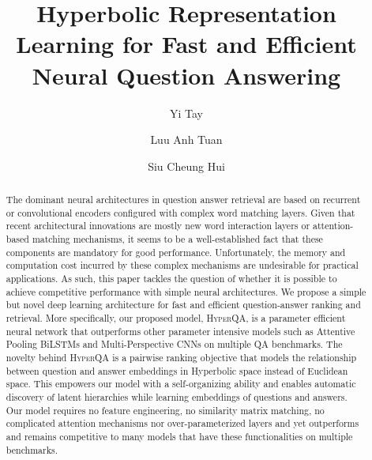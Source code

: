 \documentclass[sigconf]{acmart}
\begin{document}
\title{Hyperbolic Representation Learning for Fast and Efficient Neural Question Answering} 

\author{Yi Tay}

\author{Luu Anh Tuan}


\author{Siu Cheung Hui}


\begin{abstract}

The dominant neural architectures in question answer retrieval are based on recurrent or convolutional encoders configured with complex word matching layers. Given that recent architectural innovations are mostly new word interaction layers or attention-based matching mechanisms, it seems to be a well-established fact that these components are mandatory for good performance. Unfortunately, the memory and computation cost incurred by these complex mechanisms are undesirable for practical applications. As such, this paper tackles the question of whether it is possible to achieve competitive performance with simple neural architectures. We propose a simple but novel deep learning architecture for fast and efficient question-answer ranking and retrieval. More specifically, our proposed model, \textsc{HyperQA}, is a parameter efficient neural network that outperforms other parameter intensive models such as Attentive Pooling BiLSTMs and Multi-Perspective CNNs on multiple QA benchmarks. The novelty behind \textsc{HyperQA} 
is a pairwise ranking objective that models the relationship between question and answer embeddings in Hyperbolic space instead of Euclidean space. This empowers our model with a self-organizing ability and enables automatic discovery of latent hierarchies while learning embeddings of questions and answers. Our model requires no feature engineering, no similarity matrix matching, no complicated attention mechanisms nor over-parameterized layers and yet outperforms and remains competitive to many models that have these functionalities on multiple benchmarks.

 \end{abstract}




\maketitle
\end{document}
